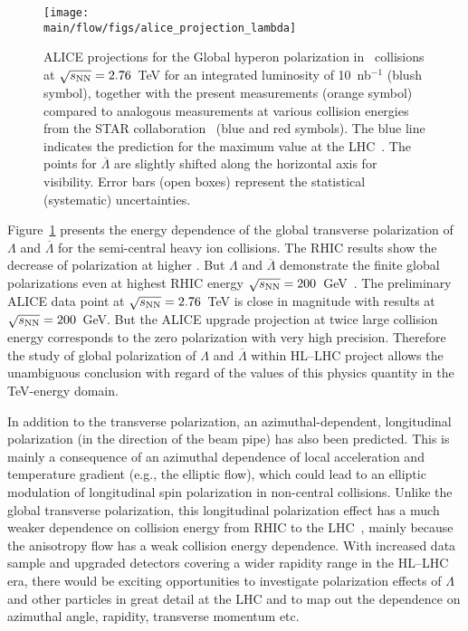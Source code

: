 \begin{figure*}[!htb]
\begin{center}
\texttt{[image: \\main/flow/figs/alice\_projection\_lambda]}
\caption{
ALICE projections for the Global hyperon polarization in \pbpb\ 
  collisions at $\sqrt{s_{\mathrm{NN}}}=2.76$~TeV for an integrated luminosity of 
	10~nb$^{-1}$ (blush symbol), together with the present measurements (orange symbol) 
	compared to analogous measurements at various collision energies from the STAR 
  collaboration~\cite{STAR:2017ckg, Abelev:2007zk} (blue and red symbols). 
The blue line indicates the prediction for the maximum value at the 
  LHC~\cite{Voloshin:ICPPA2}. 
The points for $\overline{\Lambda}$ are slightly shifted along the horizontal 
  axis for visibility.  
Error bars (open boxes) represent the statistical (systematic) uncertainties.}
\label{fig:alice_lambda}
\end{center}
\end{figure*}

Figure~\ref{fig:alice_lambda} presents the energy dependence of the global 
  transverse polarization of $\Lambda$ and $\overline{\Lambda}$ for the 
  semi-central heavy ion collisions. 
The RHIC results show the decrease of polarization at higher \snn. 
But $\Lambda$ and $\overline{\Lambda}$ demonstrate the finite global 
  polarizations even at highest RHIC energy $\sqrt{s_{\mathrm{NN}}}=200$~GeV~\cite{PRC-98-014910-2018}. 
The preliminary ALICE data point at $\sqrt{s_{\mathrm{NN}}}=2.76$~TeV is close in magnitude 
  with results at $\sqrt{s_{\mathrm{NN}}}=200$~GeV. 
But the ALICE upgrade projection at twice large collision energy corresponds 
  to the zero polarization with very high precision. 
Therefore the study of global polarization of $\Lambda$ and $\overline{\Lambda}$ 
  within HL--LHC project allows the unambiguous conclusion with regard of the 
  values of this physics quantity in the TeV-energy domain. 

In addition to the transverse polarization, an azimuthal-dependent, 
  longitudinal polarization (in the direction of the beam pipe) has 
  also been predicted. 
This is mainly a consequence of an azimuthal dependence of local acceleration 
  and temperature gradient (e.g., the elliptic flow), which could lead to an 
  elliptic modulation of longitudinal spin polarization in 
  non-central collisions. 
Unlike the global transverse polarization, this longitudinal polarization 
  effect has a much weaker dependence on collision energy from RHIC to 
  the LHC~\cite{Karpenko:2017dui}, mainly because the anisotropy flow has a 
  weak collision energy dependence. 
With increased data sample and upgraded detectors covering a wider rapidity 
  range in the HL--LHC era, there would be exciting opportunities to 
  investigate polarization effects of $\Lambda$ and other particles in great 
  detail at the LHC and to map out the dependence on azimuthal angle, 
  rapidity, transverse momentum etc.

